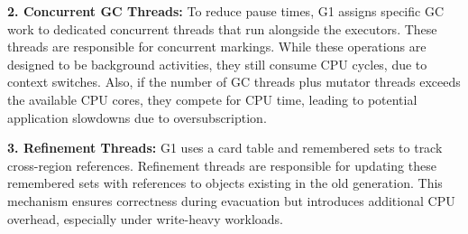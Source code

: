 \textbf{2. Concurrent GC Threads:}  
To reduce pause times, G1 assigns specific GC work to dedicated concurrent threads that run 
alongside the executors. These threads are responsible for concurrent markings.
While these operations are designed to be background activities,
they still consume CPU cycles, due to context switches. Also, if the number of GC threads plus mutator threads exceeds the available 
CPU cores, they compete for CPU time, leading to potential application slowdowns due to oversubscription.

\textbf{3. Refinement Threads:}  
G1 uses a card table and remembered sets to track cross-region references. Refinement threads 
are responsible for updating these remembered sets with references to objects existing in the old generation. 
This mechanism ensures correctness during evacuation but introduces additional CPU overhead, especially under write-heavy workloads.



